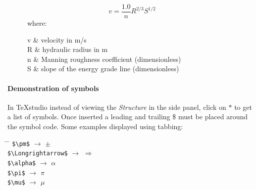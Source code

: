 \begin{figure}[H] %
	\begin{equation}\label{equ:Manning}
		v = \frac{1.0}{n} R^{2/3} S^{1/2}	
	\end{equation}
	where:
	\begin{conditions}
		v	&	velocity in m/s\\
		R	&	hydraulic radius in m\\
		n	&	Manning roughness coefficient (dimensionless)\\   
		S	&	slope of the energy grade line (dimensionless)
	\end{conditions}
\end{figure}

\paragraph{Demonstration of symbols}
In TeXstudio instead of viewing the \textit{Structure} in the side panel, click on $\ast$ to get a list of symbols. Once inserted a leading and trailing \$ must be placed around the symbol code. Some examples displayed using tabbing:
\begin{tabbing}
	\hspace{2in}     			\= \hspace{0.40in}  \= \hspace{1in}    		\kill
	\verb!$\pm$! 				\> $\rightarrow$ 	\> $\pm$ 				\\
	\verb!$\Longrightarrow$! 	\> $\rightarrow$ 	\> $\Longrightarrow$ 	\\
	\verb!$\alpha$! 			\> $\rightarrow$ 	\> $\alpha$ 			\\
	\verb!$\pi$! 				\> $\rightarrow$ 	\> $\pi$ 				\\
	\verb!$\mu$! 				\> $\rightarrow$ 	\> $\mu$	 			\\
\end{tabbing}

